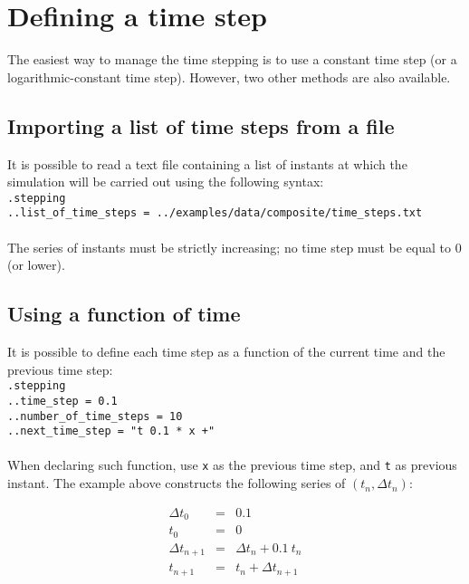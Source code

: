 \documentclass[10pt]{article}
\begin{document}
\section{Defining a time step}

The easiest way to manage the time stepping is to use a constant time step (or a logarithmic-constant time step). However, two other methods are also available.

\subsection{Importing a list of time steps from a file}

It is possible to read a text file containing a list of instants at which the simulation will be carried out using the following syntax:\\

\noindent \verb+.stepping+\\
\verb+..list_of_time_steps = ../examples/data/composite/time_steps.txt+

\paragraph{} The series of instants must be strictly increasing; no time step must be equal to 0 (or lower).

\subsection{Using a function of time}

It is possible to define each time step as a function of the current time and the previous time step:\\

\noindent \verb+.stepping+\\
\verb+..time_step = 0.1+\\
\verb+..number_of_time_steps = 10+\\
\verb#..next_time_step = "t 0.1 * x +"#

\paragraph{} When declaring such function, use \verb+x+ as the previous time step, and \verb+t+ as previous instant. The example above constructs the following series of $(t_n, \Delta t_n)$:

\begin{eqnarray}
	\Delta t_0 & = & 0.1 \\
	t_0 & = & 0  \\
	\Delta t_{n+1} & = & \Delta t_n + 0.1\ t_n \\
	t_{n+1} & = & t_n + \Delta t_{n+1}
\end{eqnarray}
\end{document}
